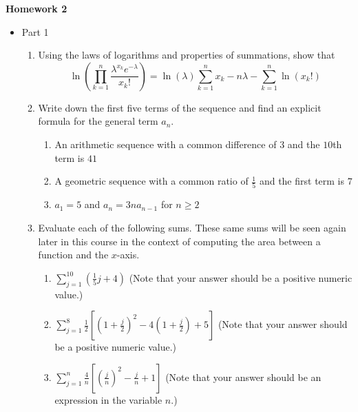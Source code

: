 \documentclass{article}
\begin{document}
    
    \begin{center}
        \large \textbf{Homework 2}
    \end{center}
            \begin{itemize}
                \item Part 1
                    \begin{enumerate}
                        \item Using the laws of logarithms and properties of summations, show that $$\ln\left(\prod_{k=1}^n \frac{\lambda^{x_k}e^{-\lambda}}{x_k!}\right)=\ln(\lambda)\sum_{k=1}^n x_k -n\lambda - \sum_{k=1}^n \ln(x_k!)$$
                        \item Write down the first five terms of the sequence and find an explicit formula for the general term $a_n$.
                            \begin{enumerate}
                                \item An arithmetic sequence with a common difference of $3$ and the $10$th term is $41$
                                \item A geometric sequence with a common ratio of $\frac{1}{5}$ and the first term is $7$
                                \item $a_1=5$ and $a_n=3na_{n-1}$ for $n\geq 2$
                            \end{enumerate}
                        \item Evaluate each of the following sums.  These same sums will be seen again later in this course in the context of computing the area between a function and the $x$-axis.
                            \begin{enumerate}
                                \item $\displaystyle \sum_{j=1}^{10} \left(\frac{1}{5}j+4\right)$  (Note that your answer should be a positive numeric value.)
                                \item $\displaystyle \sum_{j=1}^{8} \frac{1}{2}\left[\left(1+\frac{j}{2} \right)^2 -4\left( 1+ \frac{j}{2}\right) + 5\right]$  (Note that your answer should be a positive numeric value.)
                                \item $\displaystyle \sum_{j=1}^{n} \frac{4}{n}\left[ \left(\frac{j}{n}\right)^2 - \frac{j}{n} + 1 \right]$  (Note that your answer should be an expression in the variable $n$.)

\end{enumerate}
\end{enumerate}
\end{itemize}
\end{document}
